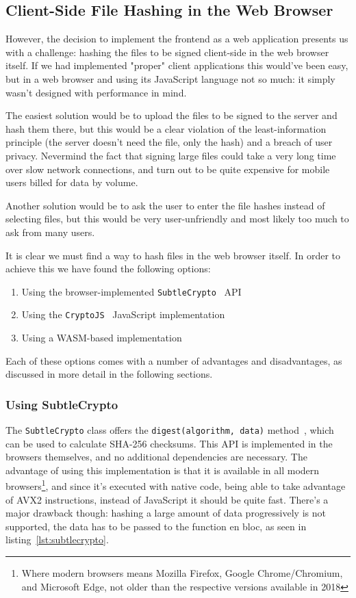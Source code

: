 \subsection{Client-Side File Hashing in the Web Browser}
\label{subsec:browserhashing}
However, the decision to implement the frontend as a web application presents us with a challenge:
hashing the files to be signed client-side in the web browser itself.
If we had implemented "proper" client applications this would've been easy, but in a web browser and using its
JavaScript language not so much: it simply wasn't designed with performance in mind.

The easiest solution would be to upload the files to be signed to the server and hash them there,
but this would be a clear violation of the least-information principle (the server doesn't need the file, only the hash)
and a breach of user privacy.
Nevermind the fact that signing large files could take a very long time over slow network connections,
and turn out to be quite expensive for mobile users billed for data by volume.

Another solution would be to ask the user to enter the file hashes instead of selecting files,
but this would be very user-unfriendly and most likely too much to ask from many users.

It is clear we must find a way to hash files in the web browser itself.
In order to achieve this we have found the following options:

\begin{enumerate}
    \item Using the browser-implemented \texttt{SubtleCrypto}~\cite{subtlecrypto} \gls{API}
    \item Using the \texttt{CryptoJS}~\cite{cryptojs} JavaScript implementation
    \item Using a \gls{WASM}-based implementation
\end{enumerate}

Each of these options comes with a number of advantages and disadvantages, as discussed in more detail in the following sections.

\subsubsection{Using SubtleCrypto}
\label{subsec:subtlecrypto}
The \texttt{SubtleCrypto} class offers the \texttt{digest(algorithm, data)} method~\cite{subtlecrypto}, which can be used to
calculate \gls{SHA-256} checksums.
This \gls{API} is implemented in the browsers themselves,
and no additional dependencies are necessary.
The advantage of using this implementation is that it is available in all modern browsers\footnote{Where modern browsers means Mozilla Firefox, Google Chrome/Chromium, and Microsoft Edge, not older than the respective versions available in 2018},
and since it's executed with native code, being able to take advantage of \gls{AVX2} instructions, instead of JavaScript it should be quite fast.
There's a major drawback though: hashing a large amount of data progressively is not supported, the data has to be
passed to the function en bloc, as seen in listing~\ref{lst:subtlecrypto}.

